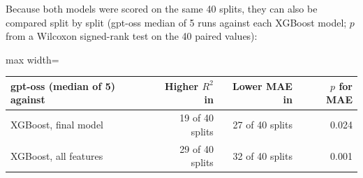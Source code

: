 \documentclass[11pt]{article}
\newcommand{\R}{$R^2$}
\begin{document}
\noindent Because both models were scored on the same 40 splits, they can also be compared
split by split (gpt-oss median of 5 runs against each XGBoost model; $p$ from a
Wilcoxon signed-rank test on the 40 paired values):

\begin{center}\small
\begin{adjustbox}{max width=\linewidth}
\begin{tabular}{lrrr}
\toprule
gpt-oss (median of 5) against & Higher \R{} in & Lower MAE in & $p$ for MAE \\
\midrule
XGBoost, final model & 19 of 40 splits & 27 of 40 splits & 0.024 \\
XGBoost, all features & 29 of 40 splits & 32 of 40 splits & 0.001 \\
\bottomrule
\end{tabular}
\end{adjustbox}
\end{center}
\end{document}

